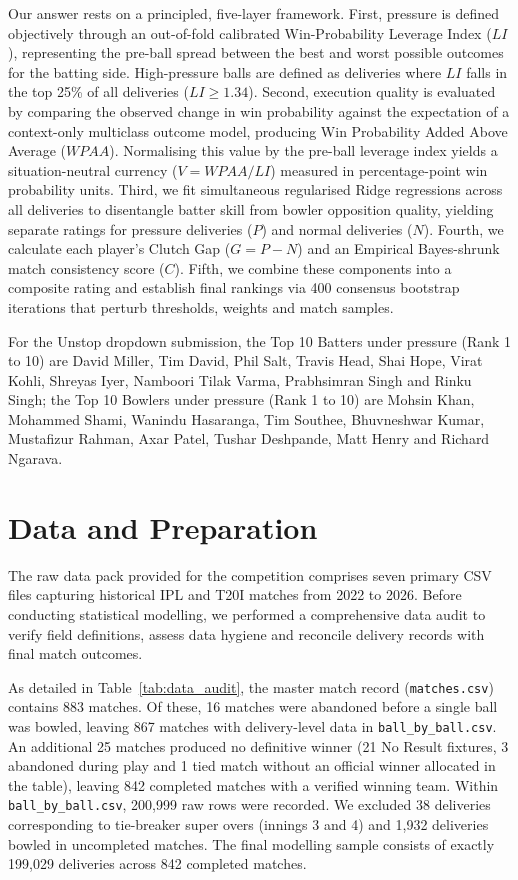 \documentclass[11pt,a4paper]{article}
\begin{document}
Our answer rests on a principled, five-layer framework. First, pressure is defined objectively through an out-of-fold calibrated Win-Probability Leverage Index ($LI$), representing the pre-ball spread between the best and worst possible outcomes for the batting side. High-pressure balls are defined as deliveries where $LI$ falls in the top 25\% of all deliveries ($LI \ge 1.34$). Second, execution quality is evaluated by comparing the observed change in win probability against the expectation of a context-only multiclass outcome model, producing Win Probability Added Above Average ($WPAA$). Normalising this value by the pre-ball leverage index yields a situation-neutral currency ($V = WPAA / LI$) measured in percentage-point win probability units. Third, we fit simultaneous regularised Ridge regressions across all deliveries to disentangle batter skill from bowler opposition quality, yielding separate ratings for pressure deliveries ($P$) and normal deliveries ($N$). Fourth, we calculate each player's Clutch Gap ($G = P - N$) and an Empirical Bayes-shrunk match consistency score ($C$). Fifth, we combine these components into a composite rating and establish final rankings via 400 consensus bootstrap iterations that perturb thresholds, weights and match samples.

For the Unstop dropdown submission, the Top 10 Batters under pressure (Rank 1 to 10) are David Miller, Tim David, Phil Salt, Travis Head, Shai Hope, Virat Kohli, Shreyas Iyer, Namboori Tilak Varma, Prabhsimran Singh and Rinku Singh; the Top 10 Bowlers under pressure (Rank 1 to 10) are Mohsin Khan, Mohammed Shami, Wanindu Hasaranga, Tim Southee, Bhuvneshwar Kumar, Mustafizur Rahman, Axar Patel, Tushar Deshpande, Matt Henry and Richard Ngarava.

\section{Data and Preparation}
\label{sec:data}

The raw data pack provided for the competition comprises seven primary CSV files capturing historical IPL and T20I matches from 2022 to 2026. Before conducting statistical modelling, we performed a comprehensive data audit to verify field definitions, assess data hygiene and reconcile delivery records with final match outcomes.



As detailed in Table~\ref{tab:data_audit}, the master match record (\texttt{matches.csv}) contains 883 matches. Of these, 16 matches were abandoned before a single ball was bowled, leaving 867 matches with delivery-level data in \texttt{ball\_by\_ball.csv}. An additional 25 matches produced no definitive winner (21 No Result fixtures, 3 abandoned during play and 1 tied match without an official winner allocated in the table), leaving 842 completed matches with a verified winning team. Within \texttt{ball\_by\_ball.csv}, 200,999 raw rows were recorded. We excluded 38 deliveries corresponding to tie-breaker super overs (innings 3 and 4) and 1,932 deliveries bowled in uncompleted matches. The final modelling sample consists of exactly 199,029 deliveries across 842 completed matches.
\end{document}
